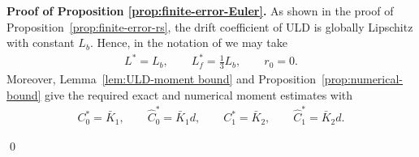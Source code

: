 \documentclass[12pt]{article}
\newenvironment{redtext}
  {\color{black}\ignorespaces}
  {\ignorespacesafterend}
\numberwithin{equation}{section}
\renewenvironment{proof}%
  {\begin{trivlist}%
   \item[]\ignorespaces}%
  {\qed\end{trivlist}}
\begin{document}
\begin{redtext}

\begin{redtext}
    
\begin{proof}
\textbf{Proof of Proposition \ref{prop:finite-error-Euler}.}
As shown in the proof of Proposition~\ref{prop:finite-error-rs},
the drift coefficient of ULD is globally Lipschitz
with constant $L_b$. Hence, in the notation of
\cite[Theorem 3.3]{yang2025non} we may take
\begin{align}
L^*=L_b,
\qquad
L_f^*=\tfrac{1}{3}L_b,
\qquad
r_0=0.
\label{eq:Euler-Yang-drift-constants}
\end{align}
Moreover, Lemma~\ref{lem:ULD-moment bound} and
Proposition~\ref{prop:numerical-bound} give the required exact and
numerical moment estimates with
\begin{align}
C_0^*=\bar K_1,
\qquad
\hat C_0^*=\bar K_1d,
\qquad
C_1^*=\bar K_2,
\qquad
\hat C_1^*=\bar K_2d.
\label{eq:Euler-Yang-moment-constants}
\end{align}


\end{proof}
\end{redtext}
\end{redtext}
\end{document}
